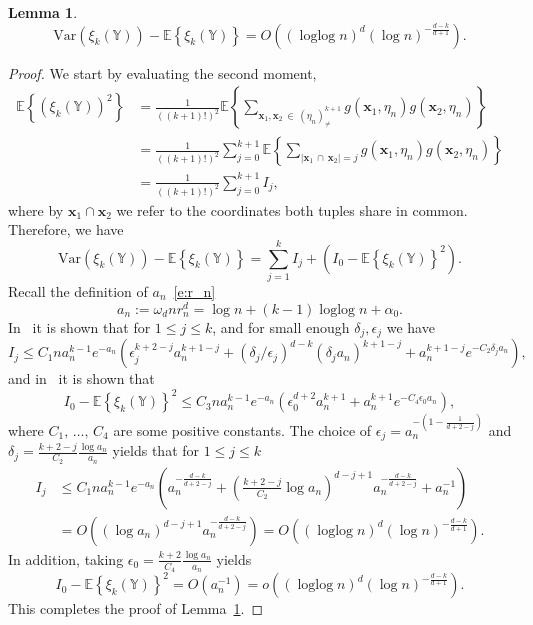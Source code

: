 \documentclass[10pt]{amsart}
\newtheorem{lemm}[theo]{Lemma}\newtheorem{prop}[theo]{Proposition}\newtheorem{coro}[theo]{Corollary}\newtheorem{conj}[theo]{Conjecture}
\theoremstyle{definition}\newtheorem{defi}[theo]{Definition}\newtheorem{rema}[theo]{Remark}\newtheorem{exam}[theo]{Example}\newtheorem{exem}[theo]{Example}\newtheorem{nota}[theo]{Notation}
\DeclareMathOperator{\logg}{\log\log}
\newcommand{\bx}{\mathbf{x}}
\newcommand*\Y{\mathbb{Y}}
\newcommand{\E}{\mathbb{E}}
\newcommand{\mean}[1] {\E\left\{{#1}\right\}}
\newcommand{\var}[1]{\mathrm{Var}\param{{#1}}}
\newcommand{\param}[1]{\left(#1\right)}
\newcommand{\abs}[1] {\left| {#1}\right|}
\newcommand{\eps}{\epsilon}
\begin{document}
\begin{lemm}\label{lem:var_ub}
\[
\var{\xi_k(\Y)} - \mean{\xi_k(\Y)} = O\param{(\logg n)^d(\log n)^{-\frac{d-k}{d+1}}}.
\]
\end{lemm}

\begin{proof}
We start by evaluating the second moment,
\begin{align*}
\mean{\left(\xi_k(\Y)\right)^2} &= \frac{1}{((k+1)!)^2} \mean{\sum_{\bx_1,\bx_2\,\in\,(\eta_n)^{k+1}_{\ne}} g\left(\bx_1,\eta_n\right) g\left(\bx_2,\eta_n\right)} \\
&= \frac{1}{((k+1)!)^2} \sum_{j=0}^{k+1} \mean{\sum_{\abs{\bx_1\,\cap\,\bx_2} =j} g\left(\bx_1,\eta_n\right) g\left(\bx_2,\eta_n\right)}\\
&= \frac{1}{((k+1)!)^2} \sum_{j=0}^{k+1}I_j,
\end{align*}
where by $\bx_1\cap\bx_2$ we refer to the coordinates both tuples share in common. Therefore, we have
\[
\var{\xi_k(\Y)} - \mean{\xi_k(\Y)} = \sum_{j=1}^kI_j + \left(I_0-\mean{\xi_k(\Y)}^2\right).
\]
Recall the definition of $a_n$~\eqref{e:r_n}
\[
a_n := \omega_d nr_n^d = \log n + (k-1)\logg n + \alpha_0.
\]
In~\cite[Equation~(8.15)]{Bobrowski2019} it is shown that for $1\le j \le k$, and for small enough $\delta_j,\eps_j$ we have
\[
I_j \le C_1 n a_n^{k-1}e^{-a_n}\param{\eps_j^{k+2-j}a_n^{k+1-j} +\left(\delta_j/\eps_j\right)^{d-k}\left(\delta_j a_n\right)^{k+1-j} + a_n^{k+1-j}e^{-C_2\delta_j a_n}},
\]
and in~\cite[Equation~(8.17)]{Bobrowski2019} it is shown that
\[
I_0-\mean{\xi_k(\Y)}^2 \le C_3 n a_n^{k-1}e^{-a_n}\param{\eps_0^{d+2}a_n^{k+1}+a_n^{k+1}e^{-C_4\eps_0 a_n}},
\]
where $C_1,\,\ldots,\,C_4$ are some positive constants. The choice of $\eps_j = a_n^{-(1-\frac{1}{d+2-j})}$ and $\delta_j = \frac{k+2-j}{C_2} \frac{\log a_n}{a_n}$ yields that for $1 \leq j \leq k$
\begin{align*}
I_j & \leq C_1 n a_n^{k-1}e^{-a_n} \param{a_n^{-\frac{d-k}{d+2-j}} +\param{\frac{k+2-j}{C_2}\log a_n}^{d-j+1}a_n^{-\frac{d-k}{d+2-j}} + a_n^{-1} } \\
& = O\param{\left(\log a_n\right)^{d-j+1}a_n^{-\frac{d-k}{d+2-j}}} = O\param{(\logg n)^{d}(\log n)^{-\frac{d-k}{d+1}}}.
\end{align*}
In addition, taking $\eps_0 = \frac{k+2}{C_4}\frac{\log a_n}{a_n}$ yields
\[
I_0-\mean{\xi_k(\Y)}^2 = O\param{a_n^{-1}} = o\param{(\logg n)^d (\log n)^{-\frac{d-k}{d+1}}}.
\]
This completes the proof of Lemma~\ref{lem:var_ub}.
\end{proof}
\end{document}
